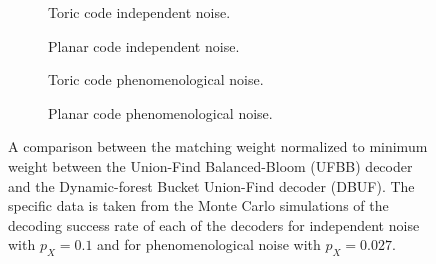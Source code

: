 \begin{figure}[htbp]
  \centering
  \begin{subfigure}[b]{0.49\textwidth}
    \begin{adjustbox}{Clip=0 1em 0 0}
      
    \end{adjustbox}
    \caption{Toric code independent noise.}
  \end{subfigure}
  \begin{subfigure}[b]{0.49\textwidth}
    \begin{adjustbox}{Clip=0 1em 0 0}
      
    \end{adjustbox}
    \caption{Planar code independent noise.}
  \end{subfigure}
  \begin{subfigure}[b]{0.49\textwidth}
    \begin{adjustbox}{Clip=0 1em 0 0}
      
    \end{adjustbox}
    \caption{Toric code phenomenological noise.}
  \end{subfigure}
  \begin{subfigure}[b]{0.49\textwidth}
    \begin{adjustbox}{Clip=0 1em 0 0}
      
    \end{adjustbox}
    \caption{Planar code phenomenological noise.}
  \end{subfigure}
  \caption{A comparison between the matching weight normalized to minimum weight between the Union-Find Balanced-Bloom (UFBB) decoder and the Dynamic-forest Bucket Union-Find decoder (DBUF). The specific data is taken from the Monte Carlo simulations of the decoding success rate of each of the decoders for independent noise with $p_X = 0.1$ and for phenomenological noise with $p_X = 0.027$.}
  \label{fig:mwcomp_ufbb}
\end{figure}


